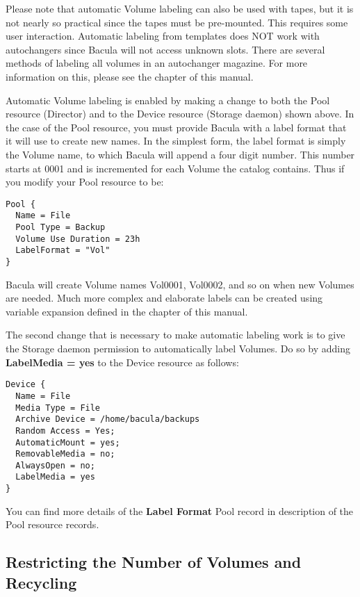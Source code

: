 Please note that automatic Volume labeling can also be used with tapes, but
it is not nearly so practical since the tapes must be pre-mounted.  This
requires some user interaction.  Automatic labeling from templates does NOT
work with autochangers since Bacula will not access unknown slots.  There
are several methods of labeling all volumes in an autochanger magazine.
For more information on this, please see the  chapter of this manual.

Automatic Volume labeling is enabled by making a change to both the Pool
resource (Director) and to the Device resource (Storage daemon) shown above.
In the case of the Pool resource, you must provide Bacula with a label format
that it will use to create new names. In the simplest form, the label format
is simply the Volume name, to which Bacula will append a four digit number.
This number starts at 0001 and is incremented for each Volume the catalog
contains. Thus if you modify your Pool resource to be: 

\footnotesize
\begin{verbatim}
Pool {
  Name = File
  Pool Type = Backup
  Volume Use Duration = 23h
  LabelFormat = "Vol"
}
\end{verbatim}
\normalsize

Bacula will create Volume names Vol0001, Vol0002, and so on when new Volumes
are needed. Much more complex and elaborate labels can be created using
variable expansion defined in the 
 chapter of this manual. 

The second change that is necessary to make automatic labeling work is to give
the Storage daemon permission to automatically label Volumes. Do so by adding
{\bf LabelMedia = yes} to the Device resource as follows: 

\footnotesize
\begin{verbatim}
Device {
  Name = File
  Media Type = File
  Archive Device = /home/bacula/backups
  Random Access = Yes;
  AutomaticMount = yes;
  RemovableMedia = no;
  AlwaysOpen = no;
  LabelMedia = yes
}
\end{verbatim}
\normalsize

You can find more details of the {\bf Label Format} Pool record in 
 description of the Pool resource
records. 

\label{Recycling1}
\subsection{Restricting the Number of Volumes and Recycling}

